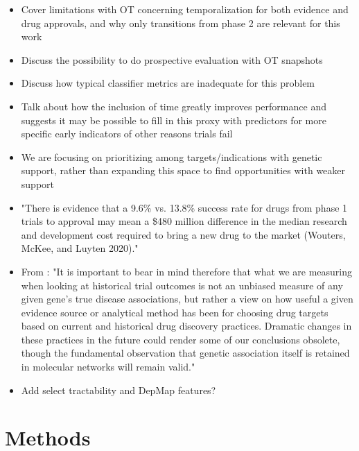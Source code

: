 \documentclass{article}
\begin{document}
\begin{itemize}
  \item Cover limitations with OT concerning temporalization for both evidence and drug approvals, and why only transitions from phase 2 are relevant for this work
  \item Discuss the possibility to do prospective evaluation with OT snapshots
  \item Discuss how typical classifier metrics are inadequate for this problem
  \item Talk about how the inclusion of time greatly improves performance and suggests it may be possible to fill in this proxy with predictors for more specific early indicators of other reasons trials fail
  \item We are focusing on prioritizing among targets/indications with genetic support, rather than expanding this space to find opportunities with weaker support
  \item "There is evidence that a 9.6\% vs. 13.8\% success rate for drugs from phase 1 trials to approval may mean a \$480 million difference in the median research and development cost required to bring a new drug to the market (Wouters, McKee, and Luyten 2020)." \cite{PMID:34930919}
  \item From \cite{PMID:33262371}: "It is important to bear in mind therefore that what we are measuring when looking at historical trial outcomes is not an unbiased measure of any given gene's true disease associations, but rather a view on how useful a given evidence source or analytical method has been for choosing drug targets based on current and historical drug discovery practices. Dramatic changes in these practices in the future could render some of our conclusions obsolete, though the fundamental observation that genetic association itself is retained in molecular networks will remain valid."
  \item Add select tractability and DepMap features?
\end{itemize}

\section{Methods}
\label{sec:methods}
\end{document}
